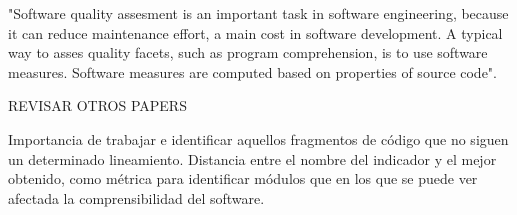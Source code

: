 "Software quality assesment is an important task in software engineering, because it can
reduce maintenance effort, a main cost in software development.
A typical way to asses quality facets, such as program comprehension, is to use software
measures.
Software measures are computed based on properties of source code"\cite{Feigenspan2011}.

REVISAR OTROS PAPERS

Importancia de trabajar e identificar aquellos fragmentos de código que no siguen un
determinado lineamiento.
Distancia entre el nombre del indicador y el mejor obtenido, como métrica para identificar
módulos que en los que se puede ver afectada la comprensibilidad del software.

